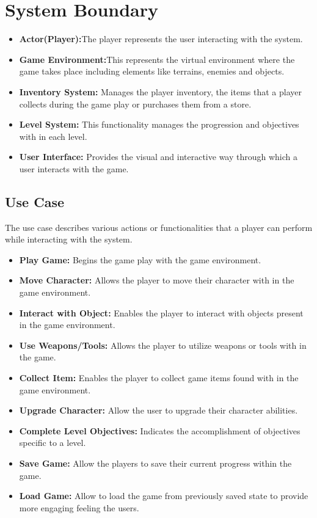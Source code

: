 \section{System Boundary}
\begin{itemize}
	\item \textbf{Actor(Player):}The player represents the user interacting with the system.
	\item \textbf{Game Environment:}This represents the virtual environment where the game takes place including elements like terrains, enemies and objects.
	\item \textbf{Inventory System:} Manages the player inventory, the items that a player collects during the game play or purchases them from a store.
	\item \textbf{Level System:} This functionality manages the progression and objectives with in each level.
	\item \textbf{User Interface:}	 Provides the visual and interactive way through which a user interacts with the game.
\end{itemize}

\subsection{Use Case}
The use case describes various actions or functionalities that a player can perform while interacting with the system.
\begin{itemize}
	\item \textbf{Play Game:} Begins the game play with the game environment.
	\item \textbf{Move Character:} Allows the player to move their character with in the game environment.
	\item \textbf{Interact with Object:} Enables the player to interact with objects present in the game environment.
	\item \textbf{Use Weapons/Tools:} Allows the player to utilize weapons or tools with in the game.
	\item \textbf{Collect Item:} Enables the player to collect game items found with in the game environment.
	\item \textbf{Upgrade Character:} Allow the user to upgrade their character abilities.
	\item \textbf{Complete Level Objectives:} Indicates the accomplishment of objectives specific to a level.
	\item \textbf{Save Game:} Allow the players to save their current progress within the game.
	\item \textbf{Load Game:} Allow to load the game from previously saved state to provide more engaging feeling the users.
\end{itemize}
